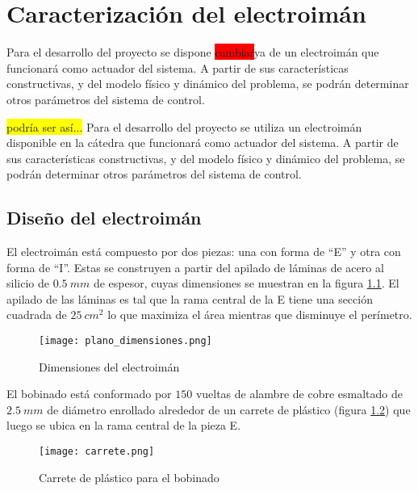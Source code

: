 \chapter{Caracterización del  electroimán}  \label{cap:CaracterizacionElectroiman}

\noindent Para el desarrollo del proyecto se dispone \colorbox{red}{cambiar}ya de un electroimán que funcionará como actuador del sistema. A partir de sus características constructivas, y del modelo físico y dinámico del problema, se podrán determinar otros parámetros del sistema de control.

\noindent\colorbox{yellow}{podría ser así...}
\noindent Para el desarrollo del proyecto se utiliza un electroimán disponible en la cátedra que funcionará como actuador del sistema. A partir de sus características constructivas, y del modelo físico y dinámico del problema, se podrán determinar otros parámetros del sistema de control.

\section{Diseño del electroimán} \label{section_disenio_electroimán}



\noindent El electroimán está compuesto por dos piezas: una con forma de “E” y otra con forma de “I”. Estas se construyen a partir del apilado de láminas de acero al silicio de $0.5\:mm$ de espesor, cuyas dimensiones se muestran en la figura \ref{fig:img_plano_dimensiones}. El apilado de las láminas es tal que la rama central de la E tiene una sección cuadrada de $25\:cm^{2}$ lo que maximiza el área mientras que disminuye el perímetro.

\begin{figure}[H]
	\centering
	\texttt{[image: plano\_dimensiones.png]}
	\caption{Dimensiones del electroimán}
	\label{fig:img_plano_dimensiones}
\end{figure}

\noindent El bobinado está conformado por $150$ vueltas de alambre de cobre esmaltado de $2.5\:mm$ de diámetro enrollado alrededor de un carrete de plástico (figura \ref{fig:img_carrete}) que luego se ubica en la rama central de la pieza E.

\begin{figure}[H]
	\centering
	\texttt{[image: carrete.png]}
	\caption{Carrete de plástico para el bobinado}
	\label{fig:img_carrete}
\end{figure}



